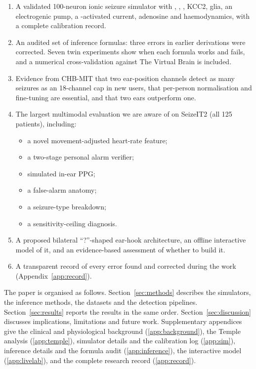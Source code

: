 \begin{enumerate}
\item A validated 100-neuron ionic seizure simulator with \Kp, \Nap, \Clm, KCC2, glia, an electrogenic pump, a \Nap-activated \Kp{} current, adenosine and haemodynamics, with a complete calibration record.
\item An audited set of inference formulas: three errors in earlier derivations were corrected. Seven twin experiments show when each formula works and fails, and a numerical cross-validation against The Virtual Brain is included.
\item Evidence from CHB-MIT that two ear-position channels detect as many seizures as an 18-channel cap in new users, that per-person normalisation and fine-tuning are essential, and that two ears outperform one.
\item The largest multimodal evaluation we are aware of on SeizeIT2 (all 125 patients), including:
\begin{itemize}
\item a novel movement-adjusted heart-rate feature;
\item a two-stage personal alarm verifier;
\item simulated in-ear PPG;
\item a false-alarm anatomy;
\item a seizure-type breakdown;
\item a sensitivity-ceiling diagnosis.
\end{itemize}
\item A proposed bilateral ``?''-shaped ear-hook architecture, an offline interactive model of it, and an evidence-based assessment of whether to build it.
\item A transparent record of every error found and corrected during the work (Appendix~\ref{app:record}).
\end{enumerate}

The paper is organised as follows. Section~\ref{sec:methods} describes the simulators, the inference methods, the datasets and the detection pipelines. Section~\ref{sec:results} reports the results in the same order. Section~\ref{sec:discussion} discusses implications, limitations and future work. Supplementary appendices give the clinical and physiological background (\ref{app:background}), the Temple analysis (\ref{app:temple}), simulator details and the calibration log (\ref{app:sim}), inference details and the formula audit (\ref{app:inference}), the interactive model (\ref{app:livelab}), and the complete research record (\ref{app:record}).
